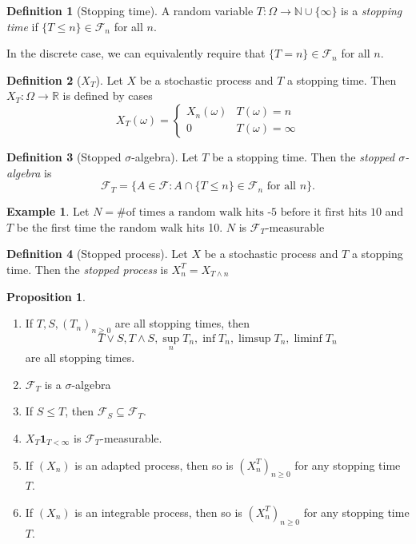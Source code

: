 \documentclass[parskip=full]{article}
\theoremstyle{definition}
\newtheorem*{definition}{Definition}
\newtheorem*{proposition}{Proposition}
\newtheorem*{example}{Example}
\newcommand{\R}{\mathbb{R}}
\newcommand{\1}{\mathbbm{1}}
\begin{document}
\begin{definition}[Stopping time]
    A random variable $T: \Omega \to \mathbb{N} \cup \{\infty\}$ is a \emph{stopping time} if $\{T \leq n\} \in \mathcal{F}_n$ for all $n$.
\end{definition}
In the discrete case, we can equivalently require that $\{T = n\} \in \mathcal{F}_n$ for all $n$.
\begin{definition}[$X_T$]
    Let $X$ be a stochastic process and $T$ a stopping time. Then $X_T: \Omega \to \R$ is defined by cases
    \[
      X_T(\omega) = \begin{cases}
        X_n(\omega) & T(\omega) = n\\
        0 & T(\omega) = \infty
      \end{cases}
    \]
\end{definition}

\begin{definition}[Stopped $\sigma$-algebra]
    Let $T$ be a stopping time. Then the \emph{stopped $\sigma$-algebra} is
    \[
      \mathcal{F}_T = \{A \in \mathcal{F}: A \cap \{T \leq n\} \in \mathcal{F}_n \text{ for all } n\}.
    \]
\end{definition}

\begin{example}
Let $N=\text{\# of times a random walk hits -5 before it first hits 10}$ and $T$ be the first time the random walk hits 10. $N$ is $\mathcal{F}_T$-measurable
\end{example}

\begin{definition}[Stopped process]
    Let $X$ be a stochastic process and $T$ a stopping time. Then the \emph{stopped process} is $X^T_n = X_{T \wedge n}$
\end{definition}

\begin{proposition}
  $ $
  \begin{enumerate}
    \item If $T, S, (T_n)_{n \geq 0}$ are all stopping times, then
      \[
        T \vee S, T \wedge S, \sup_n T_n, \inf T_n, \limsup T_n, \liminf T_n
      \]
      are all stopping times.
    \item $\mathcal{F}_T$ is a $\sigma$-algebra
    \item If $S \leq T$, then $\mathcal{F}_S \subseteq \mathcal{F}_T$.
    \item $X_T \mathbf{1}_{T < \infty}$ is $\mathcal{F}_T$-measurable.
    \item If $(X_n)$ is an adapted process, then so is $(X^T_n)_{n \geq 0}$ for any stopping time $T$.
    \item If $(X_n)$ is an integrable process, then so is $(X^T_n)_{n \geq 0}$ for any stopping time $T$.
  \end{enumerate}
\end{proposition}
\end{document}
